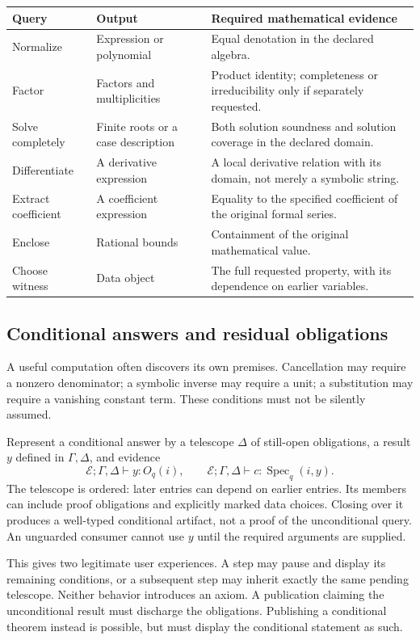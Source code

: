 \documentclass[11pt,a4paper]{article}
\newcommand{\E}{\mathcal E}
\newcommand{\Spec}{\operatorname{Spec}}
\theoremstyle{definition}
\begin{document}
\begin{tabularx}{\textwidth}{@{}P{.22\textwidth}P{.26\textwidth}Y@{}}
\toprule
Query & Output & Required mathematical evidence\\
\midrule
Normalize & Expression or polynomial & Equal denotation in the declared algebra.\\
Factor & Factors and multiplicities & Product identity; completeness or irreducibility only if separately requested.\\
Solve completely & Finite roots or a case description & Both solution soundness and solution coverage in the declared domain.\\
Differentiate & A derivative expression & A local derivative relation with its domain, not merely a symbolic string.\\
Extract coefficient & A coefficient expression & Equality to the specified coefficient of the original formal series.\\
Enclose & Rational bounds & Containment of the original mathematical value.\\
Choose witness & Data object & The full requested property, with its dependence on earlier variables.\\
\bottomrule
\end{tabularx}

\subsection{Conditional answers and residual obligations}
A useful computation often discovers its own premises. Cancellation may require a nonzero denominator; a symbolic inverse may require a unit; a substitution may require a vanishing constant term. These conditions must not be silently assumed.

Represent a conditional answer by a telescope \(\Delta\) of still-open obligations, a result \(y\) defined in \(\Gamma,\Delta\), and evidence
\[
  \E;\Gamma,\Delta\vdash y:O_q(i),
  \qquad
  \E;\Gamma,\Delta\vdash c:\Spec_q(i,y).
\]
The telescope is ordered: later entries can depend on earlier entries. Its members can include proof obligations and explicitly marked data choices. Closing over it produces a well-typed conditional artifact, not a proof of the unconditional query. An unguarded consumer cannot use \(y\) until the required arguments are supplied.

This gives two legitimate user experiences. A step may pause and display its remaining conditions, or a subsequent step may inherit exactly the same pending telescope. Neither behavior introduces an axiom. A publication claiming the unconditional result must discharge the obligations. Publishing a conditional theorem instead is possible, but must display the conditional statement as such.
\end{document}
